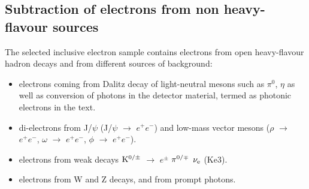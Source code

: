 


\subsection{Subtraction of electrons from non heavy-flavour sources}
The selected inclusive electron sample contains electrons from open heavy-flavour hadron decays and from  different sources of background:

\begin{itemize}
    \item electrons coming from Dalitz decay of light-neutral mesons such as $\pi^{0}$, $\eta$ as well as conversion of photons in the detector material, termed as photonic electrons in the text. 
    \item di-electrons from J/$\psi$ (J/$\psi$ $\rightarrow$ $e^{+}e^{-}$) and low-mass vector mesons ($\rho$ $\rightarrow$ $e^{+}e^{-}$, $\omega$ $\rightarrow$ $e^{+}e^{-}$, $\phi$ $\rightarrow$ $e^{+}e^{-}$).
\item electrons from weak decays $\rm K^{0/\pm}$ $\rightarrow$ $e^{\pm}$ $\rm \pi^{0/\mp}$ $\rm \nu_{e}$ (Ke3). 

\item electrons from W and Z decays, and from prompt photons.
\end{itemize}

